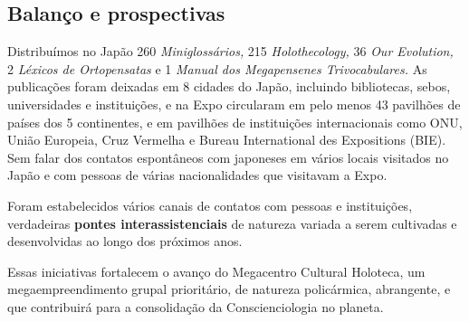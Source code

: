 \documentclass{gescons}
\begin{document}
\subsection*{Balanço e prospectivas}


Distribuímos no Japão 260 \emph{Miniglossários,} 215 \emph{Holothecology,} 36 \emph{Our Evolution,} 2 \emph{Léxicos de Ortopensatas} e 1 \emph{Manual dos Megapensenes Trivocabulares.} As publicações foram deixadas em 8 cidades do Japão, incluindo bibliotecas, sebos, universidades e instituições, e na Expo circularam em pelo menos 43 pavilhões de países dos 5 continentes, e em pavilhões de instituições internacionais como ONU, União Europeia, Cruz Vermelha e Bureau International des Expositions (BIE). Sem falar dos contatos espontâneos com japoneses em vários locais visitados no Japão e com pessoas de várias nacionalidades que visitavam a Expo.

Foram estabelecidos vários canais de contatos com pessoas e instituições, verdadeiras \textbf{pontes interassistenciais} de natureza variada a serem cultivadas e desenvolvidas ao longo dos próximos anos.

Essas iniciativas fortalecem o avanço do Megacentro Cultural Holoteca, um megaempreendimento grupal prioritário, de natureza policármica, abrangente, e que contribuirá para a consolidação da Conscienciologia no planeta.


        
\end{document}
